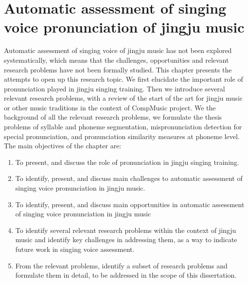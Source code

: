 \chapter[Automatic assessment of singing voice pronunciation of jingju music
]{Automatic assessment of singing voice pronunciation of jingju music
}\label{chap:probdef}

Automatic assessment of singing voice of jingju music has not been explored systematically, which means that the challenges, opportunities and relevant research problems have not been formally studied. This chapter presents the attempts to open up this research topic. We first elucidate the important role of pronunciation played in jingju singing training. Then we introduce several relevant research problems, with a review of the start of the art for jingju music or other music traditions in the context of CompMusic project. We the background of all the relevant research problems, we formulate the thesis problems of syllable and phoneme segmentation, mispronunciation detection for special pronunciation, and pronunciation similarity measures at phoneme level. The main objectives of the chapter are:

\begin{enumerate}[leftmargin=*]
	\item To present, and discuss the role of pronunciation in jingju singing training.
	\item To identify, present, and discuss main challenges to automatic assessment of singing voice pronunciation in jingju music.
	\item To identify, present, and discuss main opportunities in automatic assessment of singing voice pronunciation in jingju music
	\item To identify several relevant research problems within the context of jingju music and identify key challenges in addressing them, as a way to indicate future work in singing voice assessment.
	\item From the relevant problems, identify a subset of research problems and formulate them in detail, to be addressed in the scope of this dissertation.
\end{enumerate}
%
